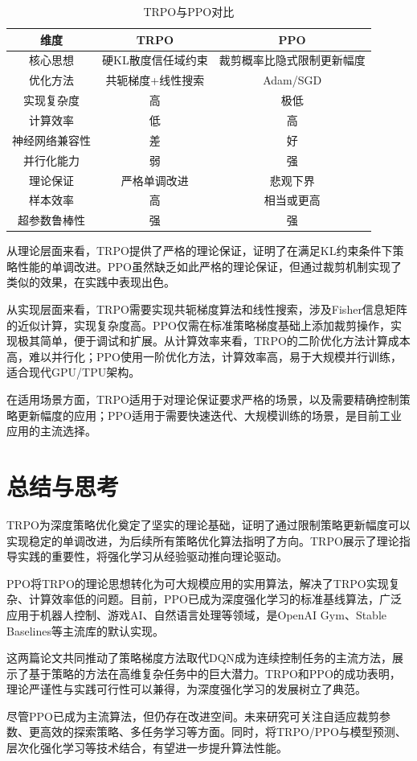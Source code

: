 \documentclass[12pt,a4paper]{article}
\begin{document}
\begin{table}[h]
\centering
\caption{TRPO与PPO对比}
\label{tab:comparison}
\renewcommand{\arraystretch}{1.6}
\begin{tabular}{c c c}
\toprule
\textbf{维度} & \textbf{TRPO} & \textbf{PPO} \\
\midrule
核心思想 & 硬KL散度信任域约束 & 裁剪概率比隐式限制更新幅度 \\
优化方法 & 共轭梯度+线性搜索 & Adam/SGD \\
实现复杂度 & 高 & 极低 \\
计算效率 & 低 & 高 \\
神经网络兼容性 & 差 & 好 \\
并行化能力 & 弱 & 强 \\
理论保证 & 严格单调改进 & 悲观下界 \\
样本效率 & 高 & 相当或更高 \\
超参数鲁棒性 & 强 & 强 \\
\bottomrule
\end{tabular}
\end{table}

从理论层面来看，TRPO提供了严格的理论保证，证明了在满足KL约束条件下策略性能的单调改进。PPO虽然缺乏如此严格的理论保证，但通过裁剪机制实现了类似的效果，在实践中表现出色。

从实现层面来看，TRPO需要实现共轭梯度算法和线性搜索，涉及Fisher信息矩阵的近似计算，实现复杂度高。PPO仅需在标准策略梯度基础上添加裁剪操作，实现极其简单，便于调试和扩展。从计算效率来看，TRPO的二阶优化方法计算成本高，难以并行化；PPO使用一阶优化方法，计算效率高，易于大规模并行训练，适合现代GPU/TPU架构。

在适用场景方面，TRPO适用于对理论保证要求严格的场景，以及需要精确控制策略更新幅度的应用；PPO适用于需要快速迭代、大规模训练的场景，是目前工业应用的主流选择。

\section{总结与思考}

TRPO为深度策略优化奠定了坚实的理论基础，证明了通过限制策略更新幅度可以实现稳定的单调改进，为后续所有策略优化算法指明了方向。TRPO展示了理论指导实践的重要性，将强化学习从经验驱动推向理论驱动。

PPO将TRPO的理论思想转化为可大规模应用的实用算法，解决了TRPO实现复杂、计算效率低的问题。目前，PPO已成为深度强化学习的标准基线算法，广泛应用于机器人控制、游戏AI、自然语言处理等领域，是OpenAI Gym、Stable Baselines等主流库的默认实现。

这两篇论文共同推动了策略梯度方法取代DQN成为连续控制任务的主流方法，展示了基于策略的方法在高维复杂任务中的巨大潜力。TRPO和PPO的成功表明，理论严谨性与实践可行性可以兼得，为深度强化学习的发展树立了典范。

尽管PPO已成为主流算法，但仍存在改进空间。未来研究可关注自适应裁剪参数、更高效的探索策略、多任务学习等方面。同时，将TRPO/PPO与模型预测、层次化强化学习等技术结合，有望进一步提升算法性能。

\vspace{18pt}
\end{document}
